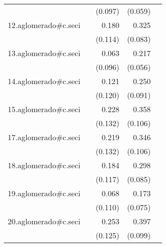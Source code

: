 {\begin{longtable}{l*{4}{D{.}{.}{-1}}}
            &                     &     (0.097)         &     (0.059)         &                     \\
\addlinespace
12.aglomerado#c.seci&                     &       0.180         &       0.325\sym{***}&                     \\
            &                     &     (0.114)         &     (0.083)         &                     \\
\addlinespace
13.aglomerado#c.seci&                     &       0.063         &       0.217\sym{***}&                     \\
            &                     &     (0.096)         &     (0.056)         &                     \\
\addlinespace
14.aglomerado#c.seci&                     &       0.121         &       0.250\sym{**} &                     \\
            &                     &     (0.120)         &     (0.091)         &                     \\
\addlinespace
15.aglomerado#c.seci&                     &       0.228         &       0.358\sym{***}&                     \\
            &                     &     (0.132)         &     (0.106)         &                     \\
\addlinespace
17.aglomerado#c.seci&                     &       0.219         &       0.346\sym{**} &                     \\
            &                     &     (0.132)         &     (0.106)         &                     \\
\addlinespace
18.aglomerado#c.seci&                     &       0.184         &       0.298\sym{***}&                     \\
            &                     &     (0.117)         &     (0.085)         &                     \\
\addlinespace
19.aglomerado#c.seci&                     &       0.068         &       0.173\sym{*}  &                     \\
            &                     &     (0.110)         &     (0.075)         &                     \\
\addlinespace
20.aglomerado#c.seci&                     &       0.253\sym{*}  &       0.397\sym{***}&                     \\
            &                     &     (0.125)         &     (0.099)         &                     \\

\end{longtable}}
